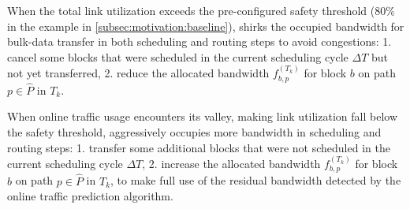 {\begin{table}[t]
\begin{center}
\end{center}
\caption{}
\label{table:adjustment}
\end{table}

\begin{packeditemize}
\item When the total link utilization exceeds the pre-configured safety threshold (80\% in the example in \Section\ref{subsec:motivation:baseline}), \name shirks the occupied bandwidth for bulk-data transfer in both scheduling and routing steps to avoid congestions: 1. cancel some blocks that were scheduled in the current scheduling cycle $\Delta T$ but not yet transferred, 2. reduce the allocated bandwidth $f_{b,p}^{(T_k)}$ for block $b$ on path $p\in \hat{P}$ in $T_k$.

\item When online traffic usage encounters its valley, making link utilization fall below the safety threshold, \name aggressively occupies more bandwidth in scheduling and routing steps: 1. transfer some additional blocks that were not scheduled in the current scheduling cycle $\Delta T$, 2. increase the allocated bandwidth $f_{b,p}^{(T_k)}$ for block $b$ on path $p\in \hat{P}$ in $T_k$, to make full use of the residual bandwidth detected by the online traffic prediction algorithm.
\end{packeditemize}




}
